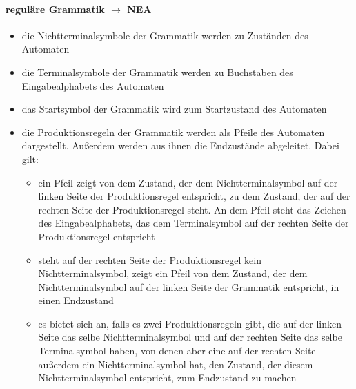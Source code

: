 \documentclass{article}
\begin{document}
	\paragraph{reguläre Grammatik $\rightarrow$ NEA}
	\begin{itemize}
		\item die Nichtterminalsymbole der Grammatik werden zu Zuständen des Automaten
		\item die Terminalsymbole der Grammatik werden zu Buchstaben des Eingabealphabets des Automaten
		\item das Startsymbol der Grammatik wird zum Startzustand des Automaten
		\item die Produktionsregeln der Grammatik werden als Pfeile des Automaten dargestellt. Außerdem werden aus ihnen die Endzustände abgeleitet. Dabei gilt:
		\begin{itemize}
			\item ein Pfeil zeigt von dem Zustand, der dem Nichtterminalsymbol auf der linken Seite der Produktionsregel entspricht, zu dem Zustand, der auf der rechten Seite der Produktionsregel steht. An dem Pfeil steht das Zeichen des Eingabealphabets, das dem Terminalsymbol auf der rechten Seite der Produktionsregel entspricht
			\item steht auf der rechten Seite der Produktionsregel kein Nichtterminalsymbol, zeigt ein Pfeil von dem Zustand, der dem Nichtterminalsymbol auf der linken Seite der Grammatik entspricht, in einen Endzustand
			\item es bietet sich an, falls es zwei Produktionsregeln gibt, die auf der linken Seite das selbe Nichtterminalsymbol und auf der rechten Seite das selbe Terminalsymbol haben, von denen aber eine auf der rechten Seite außerdem ein Nichtterminalsymbol hat, den Zustand, der diesem Nichtterminalsymbol entspricht, zum Endzustand zu machen
		\end{itemize}
	\end{itemize}
	
\end{document}
